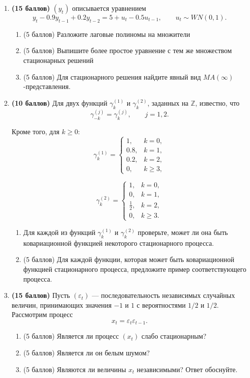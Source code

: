 \documentclass[12pt]{article}
\newcommand \e{\varepsilon}
\begin{document}
\begin{enumerate}
\begin{enumerate}
    \end{enumerate}
    
    \item \textbf{(15 баллов)} $(y_t)$ описывается уравнением
    \[
    y_t - 0.9 y_{t-1} + 0.2 y_{t-2} =5 + u_t - 0.5 u_{t-1},
    \qquad u_t \sim WN(0,1).
    \]
    
    \begin{enumerate}
        \item (5 баллов) Разложите лаговые полиномы на множители
        \item (5 баллов) Выпишите более простое уравнение с тем же множеством стационарных решений
        \item (5 баллов) Для стационарного решения найдите явный вид $MA(\infty)$-представления.
    \end{enumerate}
    
\item \textbf{(10 баллов)} Для двух функций $\gamma^{(1)}_k$ и $\gamma^{(2)}_k$, заданных на $\mathbb{Z}$, известно, что
\[
\gamma^{(j)}_{-k}=\gamma^{(j)}_k, \qquad j=1,2.
\]

Кроме того, для $k \ge 0$:
\[
\gamma^{(1)}_k =
\begin{cases}
1, & k=0,\\
0.8, & k=1,\\
0.2, & k=2,\\
0, & k\ge 3,
\end{cases}
\]

\[
\gamma^{(2)}_k =
\begin{cases}
1, & k=0,\\
0, & k=1,\\
\frac12, & k=2,\\
0, & k\ge 3.
\end{cases}
\]

\begin{enumerate}
    \item Для каждой из функций $\gamma^{(1)}_k$ и $\gamma^{(2)}_k$ проверьте, может ли она быть ковариационной функцией некоторого стационарного процесса.
    
    \item (5 баллов) Для каждой функции, которая может быть ковариационной функцией стационарного процесса, предложите пример соответствующего процесса.
\end{enumerate}
    
    \item \textbf{(15 баллов)} Пусть $(\e_t)$ --- последовательность независимых случайных величин, принимающих значения $-1$ и $1$ с вероятностями $1/2$ и $1/2$. Рассмотрим процесс
    \[
    x_t = \e_t \e_{t-1}.
    \]
    
    \begin{enumerate}
        \item (5 баллов) Является ли процесс $(x_t)$ слабо стационарным?
        \item (5 баллов) Является ли он белым шумом?
        \item (5 баллов) Являются ли величины $x_t$ независимыми? Ответ обоснуйте.
    \end{enumerate}
    
\end{enumerate}
\end{document}
